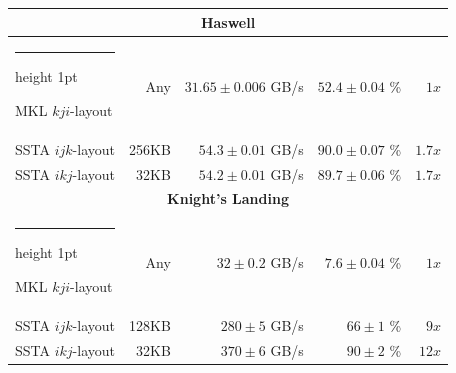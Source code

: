 \documentclass[10pt, conference, compsocconf]{IEEEtran}
\makeatletter
\newcommand{\textapprox}{\texttildelow}
\newcommand{\thickhline}{%
    \noalign {\ifnum 0=`}\fi \hrule height 1pt
    \futurelet \reserved@a \@xhline
}
\makeatother
\begin{document}
\begin{table}[t]
\begin{tabular}{|l|r|r|r|r|}
    \multicolumn{5}{c}{\rule{0pt}{2.25ex} \textbf{Haswell}}           \\ \hline \thickhline
    MKL \(kji\)-layout  &   Any & \(31.65 \pm 0.006\) GB/s & \(52.4 \pm 0.04\) \% & \(1x\)        \\ \hline
    SSTA \(ijk\)-layout & 256KB &   \(54.3 \pm 0.01\) GB/s & \(90.0 \pm 0.07\) \% & \textapprox \(1.7x\) \\ \hline
    SSTA \(ikj\)-layout &  32KB &   \(54.2 \pm 0.01\) GB/s & \(89.7 \pm 0.06\) \% & \textapprox \(1.7x\) \\ \hline

    \multicolumn{5}{c}{\rule{0pt}{2.25ex} \textbf{Knight's Landing}}  \\ \hline \thickhline
    MKL \(kji\)-layout  &   Any & \(32 \pm 0.2\) GB/s &\(7.6 \pm 0.04\) \% & \(1x\)               \\ \hline
    SSTA \(ijk\)-layout & 128KB &  \(280 \pm 5\) GB/s &\(66 \pm 1\) \%     & \textapprox \(9x\)          \\ \hline
    SSTA \(ikj\)-layout &  32KB &  \(370 \pm 6\) GB/s &\(90 \pm 2\) \%     & \textapprox \(12x\)         \\ \hline
  \end{tabular}
  \vspace{-2mm}
\end{table}


\end{document}
